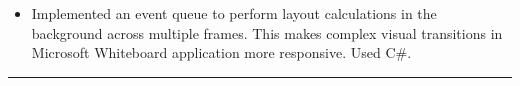 \documentclass[10.5pt,letterpaper]{article}
\begin{document}
\begin{itemize}
    \begin{itemize}[label=\textbullet]
      \itemsep0.1em
      \item Implemented an event queue to perform layout calculations in the background 
      across multiple frames. This makes complex visual transitions in Microsoft Whiteboard application
      more responsive. Used C\#.
    \end{itemize}


  \end{itemize}
  
\hrule
\vspace{-0.95em}
\end{document}
